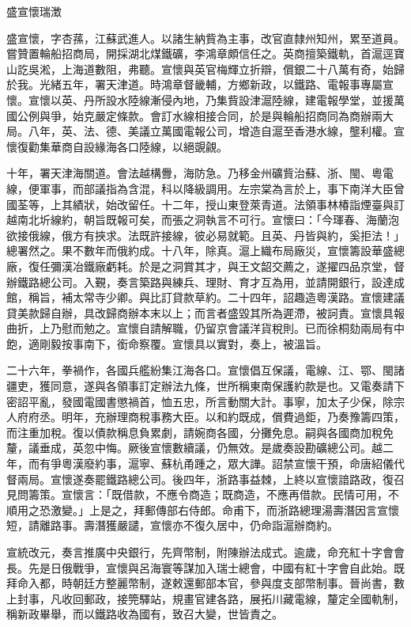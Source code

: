 
\begin{pinyinscope}
盛宣懷瑞澂

盛宣懷，字杏蓀，江蘇武進人。以諸生納貲為主事，改官直隸州知州，累至道員。嘗贊置輪船招商局，開採湖北煤鐵礦，李鴻章頗信任之。英商擅築鐵軌，首滬逕寶山訖吳淞，上海道數阻，弗聽。宣懷與英官梅輝立折辯，償銀二十八萬有奇，始歸於我。光緒五年，署天津道。時鴻章督畿輔，方鄉新政，以鐵路、電報事專屬宣懷。宣懷以英、丹所設水陸線漸侵內地，乃集貲設津滬陸線，建電報學堂，並援萬國公例與爭，始克嚴定條款。會訂水線相接合同，於是與輪船招商同為商辦兩大局。八年，英、法、德、美議立萬國電報公司，增造自滬至香港水線，壟利權。宣懷復勸集華商自設緣海各口陸線，以絕覬覦。

十年，署天津海關道。會法越構釁，海防急。乃移金州礦貲治蘇、浙、閩、粵電線，便軍事，而部議指為含混，科以降級調用。左宗棠為言於上，事下南洋大臣曾國荃等，上其績狀，始改留任。十二年，授山東登萊青道。法領事林椿詣煙臺與訂越南北圻線約，朝旨既報可矣，而張之洞執言不可行。宣懷曰：「今琿春、海蘭泡欲接俄線，俄方有挾求。法既許接線，彼必易就範。且英、丹皆與約，奚拒法！」總署然之。果不數年而俄約成。十八年，除真。滬上織布局廠災，宣懷籌設華盛總廠，復任彌漢冶鐵廠虧耗。於是之洞賞其才，與王文韶交薦之，遂擢四品京堂，督辦鐵路總公司。入覲，奏言築路與練兵、理財、育才互為用，並請開銀行，設達成館，稱旨，補太常寺少卿。與比訂貸款草約。二十四年，詔趣造粵漢路。宣懷建議貸美款歸自辦，具改歸商辦本末以上；而言者盛毀其所為遲滯，被訶責。宣懷具報曲折，上乃慰而勉之。宣懷自請解職，仍留京會議洋貨稅則。已而徐桐劾兩局有中飽，適剛毅按事南下，銜命察覆。宣懷具以實對，奏上，被溫旨。

二十六年，拳禍作，各國兵艦紛集江海各口。宣懷倡互保議，電線、江、鄂、閩諸疆吏，獲同意，遂與各領事訂定辦法九條，世所稱東南保護約款是也。又電奏請下密詔平亂，發國電國書懲禍首，恤五忠，所言動關大計。事寧，加太子少保，除宗人府府丞。明年，充辦理商稅事務大臣。以和約既成，償費過鉅，乃奏豫籌四策，而注重加稅。復以債款稱息負累劇，請婉商各國，分攤免息。嗣與各國商加稅免釐，議垂成，英忽中悔。厥後宣懷數續議，仍無效。是歲奏設勘礦總公司。越二年，而有爭粵漢廢約事，滬寧、蘇杭甬踵之，眾大譁。詔禁宣懷干預，命唐紹儀代督兩局。宣懷遂奏罷鐵路總公司。後四年，浙路事益棘，上終以宣懷諳路政，復召見問籌策。宣懷言：「既借款，不應令商造；既商造，不應再借款。民情可用，不順用之恐激變。」上是之，拜郵傳部右侍郎。命甫下，而浙路總理湯壽潛因言宣懷短，請離路事。壽潛獲嚴譴，宣懷亦不復久居中，仍命詣滬辦商約。

宣統改元，奏言推廣中央銀行，先齊幣制，附陳辦法成式。逾歲，命充紅十字會會長。先是日俄戰爭，宣懷與呂海寰等謀加入瑞士總會，中國有紅十字會自此始。既拜命入都，時朝廷方整麗幣制，遂敕還郵部本官，參與度支部幣制事。晉尚書，數上封事，凡收回郵政，接筦驛站，規畫官建各路，展拓川藏電線，釐定全國軌制，稱新政畢舉，而以鐵路收為國有，致召大變，世皆責之。


\end{pinyinscope}
